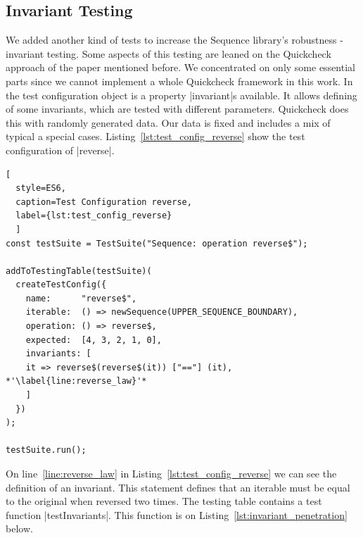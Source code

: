 \subsection{Invariant Testing}
\label{sub:Invariant Testing}
We added another kind of tests to increase the Sequence library's robustness -
invariant testing. Some aspects of this testing are leaned on the Quickcheck
approach of the paper mentioned before. We concentrated on only some essential
parts since we cannot implement a whole Quickcheck framework in this work.
\newline
In the test configuration object
is a property |invariant|s available. It allows defining of some invariants, which are
tested with different parameters. Quickcheck does this with randomly generated
data. Our data is fixed and includes a mix of typical a special cases.
\newline
Listing~\ref{lst:test_config_reverse} show the test configuration of |reverse|.

\begin{lstlisting}[
  style=ES6, 
  caption=Test Configuration reverse,
  label={lst:test_config_reverse}
  ]
const testSuite = TestSuite("Sequence: operation reverse$");

addToTestingTable(testSuite)(
  createTestConfig({
    name:      "reverse$",
    iterable:  () => newSequence(UPPER_SEQUENCE_BOUNDARY),
    operation: () => reverse$,
    expected:  [4, 3, 2, 1, 0],
    invariants: [
    it => reverse$(reverse$(it)) ["=="] (it), *'\label{line:reverse_law}'*
    ]
  })
);

testSuite.run();
\end{lstlisting}
On line~\ref{line:reverse_law} in Listing~\ref{lst:test_config_reverse} we can 
see the definition of an invariant. This statement defines that an iterable must be 
equal to the original when reversed two times.
\newline
The testing table contains a test function |testInvariants|. This function is on
Listing~\ref{lst:invariant_penetration} below.


